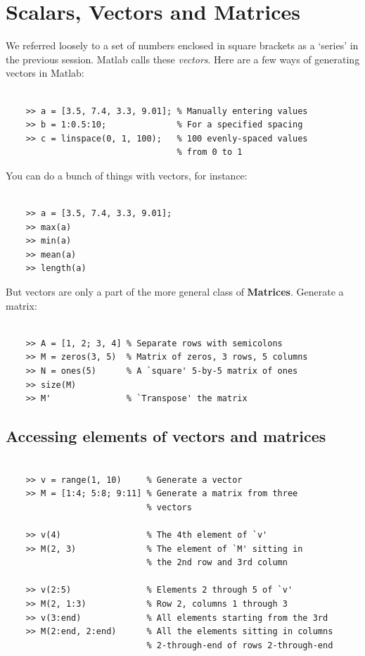 \documentclass{article}
\begin{document}
\section*{Scalars, Vectors and Matrices}

We referred loosely to a set of numbers enclosed in square brackets
as a `series' in the previous session. Matlab calls these \emph{vectors}. 
Here are a few ways of generating vectors in Matlab:

\begin{verbatim}
    
    >> a = [3.5, 7.4, 3.3, 9.01]; % Manually entering values
    >> b = 1:0.5:10;              % For a specified spacing
    >> c = linspace(0, 1, 100);   % 100 evenly-spaced values 
                                  % from 0 to 1
\end{verbatim}

You can do a bunch of things with vectors, for instance:

\begin{verbatim}
    
    >> a = [3.5, 7.4, 3.3, 9.01];
    >> max(a)
    >> min(a)
    >> mean(a)
    >> length(a)

\end{verbatim}

But vectors are only a part of the more general class of \textbf{Matrices}.
Generate a matrix:

\begin{verbatim}

    >> A = [1, 2; 3, 4] % Separate rows with semicolons
    >> M = zeros(3, 5)  % Matrix of zeros, 3 rows, 5 columns
    >> N = ones(5)      % A `square' 5-by-5 matrix of ones
    >> size(M)
    >> M'               % `Transpose' the matrix

\end{verbatim}

\subsection*{Accessing elements of vectors and matrices}

\begin{verbatim}

    >> v = range(1, 10)     % Generate a vector
    >> M = [1:4; 5:8; 9:11] % Generate a matrix from three 
                            % vectors
    
    >> v(4)                 % The 4th element of `v'
    >> M(2, 3)              % The element of `M' sitting in
                            % the 2nd row and 3rd column

    >> v(2:5)               % Elements 2 through 5 of `v'
    >> M(2, 1:3)            % Row 2, columns 1 through 3
    >> v(3:end)             % All elements starting from the 3rd
    >> M(2:end, 2:end)      % All the elements sitting in columns
                            % 2-through-end of rows 2-through-end
\end{verbatim}
\end{document}

